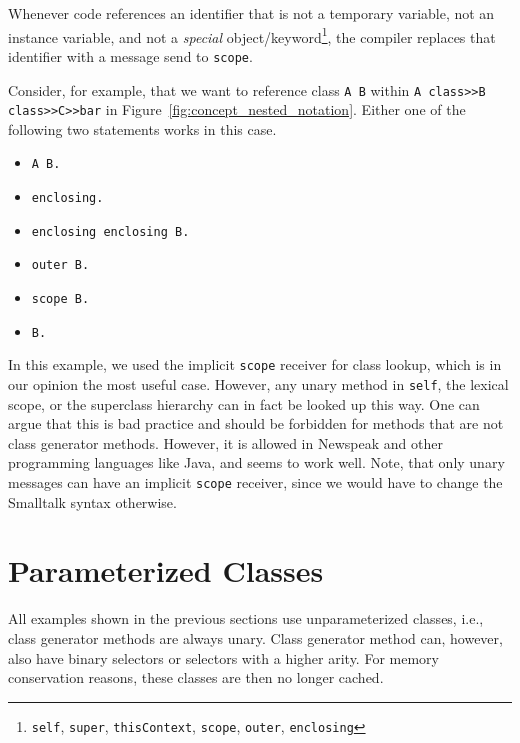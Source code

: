 Whenever code references an identifier that is not a temporary variable, not an instance variable, and not a \emph{special} object/keyword\footnote{\texttt{self}, \texttt{super}, \texttt{thisContext}, \texttt{scope}, \texttt{outer}, \texttt{enclosing}}, the compiler replaces that identifier with a message send to \texttt{scope}.

Consider, for example, that we want to reference class \texttt{A B} within \texttt{A class>>B class>>C>>bar} in Figure~\ref{fig:concept_nested_notation}. Either one of the following two statements works in this case.

\begin{itemize}
	\item \texttt{A B.}
	\item \texttt{enclosing.}
	\item \texttt{enclosing enclosing B.}
	\item \texttt{outer B.}
	\item \texttt{scope B.}
	\item \texttt{B.}
\end{itemize}

In this example, we used the implicit \texttt{scope} receiver for class lookup, which is in our opinion the most useful case. However, any unary method in \texttt{self}, the lexical scope, or the superclass hierarchy can in fact be looked up this way. One can argue that this is bad practice and should be forbidden for methods that are not class generator methods. However, it is allowed in Newspeak and other programming languages like Java, and seems to work well. Note, that only unary messages can have an implicit \texttt{scope} receiver, since we would have to change the Smalltalk syntax otherwise.

\section{Parameterized Classes}
All examples shown in the previous sections use unparameterized classes, i.e., class generator methods are always unary. Class generator method can, however, also have binary selectors or selectors with a higher arity. For memory conservation reasons, these classes are then no longer cached.

